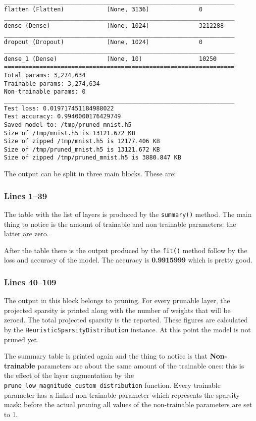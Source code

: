 \begin{lstlisting}[label={lst:mnistpipelineoutput},
    caption=MNIST pipeline output execution]
_________________________________________________________________
flatten (Flatten)            (None, 3136)              0
_________________________________________________________________
dense (Dense)                (None, 1024)              3212288
_________________________________________________________________
dropout (Dropout)            (None, 1024)              0
_________________________________________________________________
dense_1 (Dense)              (None, 10)                10250
=================================================================
Total params: 3,274,634
Trainable params: 3,274,634
Non-trainable params: 0
_________________________________________________________________
Test loss: 0.019717451184988022
Test accuracy: 0.9940000176429749
Saved model to: /tmp/pruned_mnist.h5
Size of /tmp/mnist.h5 is 13121.672 KB
Size of zipped /tmp/mnist.h5 is 12177.406 KB
Size of /tmp/pruned_mnist.h5 is 13121.672 KB
Size of zipped /tmp/pruned_mnist.h5 is 3880.847 KB
\end{lstlisting}

The output can be split in three main blocks. These are:

\subsubsection{Lines 1--39}
The table with the list of layers is produced by the
\texttt{summary\string(\string)} method. The main thing to notice is the amount
of trainable and non trainable parameters: the latter are zero.

After the table there is the output produced by the
\texttt{fit\string(\string)} method follow by the loss and accuracy of the
model. The accuracy is \textbf{0.9915999} which is pretty good.

\subsubsection{Lines 40--109}
The output in this block belongs to pruning. For every prunable layer, the
projected sparsity is printed along with the number of weights that will be
zeroed. The total projected sparsity is the reported. These figures are
calculated by the \texttt{HeuristicSparsityDistribution} instance. At this
point the model is not pruned yet.

The summary table is printed again and the thing to notice is that
\textbf{Non-trainable} parameters are about the same amount of the trainable
ones: this is the effect of the layer augmentation by the \linebreak
\texttt{prune\_low\_magnitude\_custom\_distribution} function.
Every trainable parameter has a linked non-trainable parameter which represents
the sparsity mask: before the actual pruning all values of the non-trainable
parameters are set to 1.

